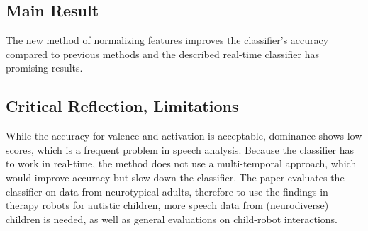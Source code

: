 \documentclass[smallheadings,english, DIV14]{scrartcl}
\begin{document}
\subsection*{Main Result}
The new method of normalizing features improves the classifier's accuracy compared to previous methods and the described real-time classifier has promising results.
\subsection*{Critical Reflection, Limitations}
While the accuracy for valence and activation is acceptable, dominance shows low scores, which is a frequent problem in speech analysis. Because the classifier has to work in real-time, the method does not use a multi-temporal approach, which would improve accuracy but slow down the classifier. The paper evaluates the classifier on data from neurotypical adults, therefore to use the findings in therapy robots for autistic children, more speech data from (neurodiverse) children is needed, as well as general evaluations on child-robot interactions.

\clearpage
\end{document}
